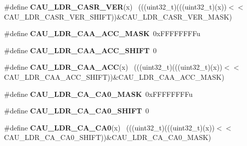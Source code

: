 \begin{DoxyCompactItemize}
\item 
\hypertarget{group___c_a_u___register___masks_ga2188570babc40431a7ef99097d863534}{}\#define {\bfseries C\+A\+U\+\_\+\+L\+D\+R\+\_\+\+C\+A\+S\+R\+\_\+\+V\+E\+R}(x)                                        ~(((uint32\+\_\+t)(((uint32\+\_\+t)(x))$<$$<$C\+A\+U\+\_\+\+L\+D\+R\+\_\+\+C\+A\+S\+R\+\_\+\+V\+E\+R\+\_\+\+S\+H\+I\+F\+T))\&C\+A\+U\+\_\+\+L\+D\+R\+\_\+\+C\+A\+S\+R\+\_\+\+V\+E\+R\+\_\+\+M\+A\+S\+K)\label{group___c_a_u___register___masks_ga2188570babc40431a7ef99097d863534}

\item 
\hypertarget{group___c_a_u___register___masks_ga25d23cb2902598fd7377214fc4c831c4}{}\#define {\bfseries C\+A\+U\+\_\+\+L\+D\+R\+\_\+\+C\+A\+A\+\_\+\+A\+C\+C\+\_\+\+M\+A\+S\+K}~0x\+F\+F\+F\+F\+F\+F\+F\+Fu\label{group___c_a_u___register___masks_ga25d23cb2902598fd7377214fc4c831c4}

\item 
\hypertarget{group___c_a_u___register___masks_ga3d0a4b449aa40e73d9ef6540832fec08}{}\#define {\bfseries C\+A\+U\+\_\+\+L\+D\+R\+\_\+\+C\+A\+A\+\_\+\+A\+C\+C\+\_\+\+S\+H\+I\+F\+T}~0\label{group___c_a_u___register___masks_ga3d0a4b449aa40e73d9ef6540832fec08}

\item 
\hypertarget{group___c_a_u___register___masks_ga4c5e6496e3c7b2325fc05f933002b553}{}\#define {\bfseries C\+A\+U\+\_\+\+L\+D\+R\+\_\+\+C\+A\+A\+\_\+\+A\+C\+C}(x)                                          ~(((uint32\+\_\+t)(((uint32\+\_\+t)(x))$<$$<$C\+A\+U\+\_\+\+L\+D\+R\+\_\+\+C\+A\+A\+\_\+\+A\+C\+C\+\_\+\+S\+H\+I\+F\+T))\&C\+A\+U\+\_\+\+L\+D\+R\+\_\+\+C\+A\+A\+\_\+\+A\+C\+C\+\_\+\+M\+A\+S\+K)\label{group___c_a_u___register___masks_ga4c5e6496e3c7b2325fc05f933002b553}

\item 
\hypertarget{group___c_a_u___register___masks_ga15ab69e214b180e4459b220f28db6671}{}\#define {\bfseries C\+A\+U\+\_\+\+L\+D\+R\+\_\+\+C\+A\+\_\+\+C\+A0\+\_\+\+M\+A\+S\+K}~0x\+F\+F\+F\+F\+F\+F\+F\+Fu\label{group___c_a_u___register___masks_ga15ab69e214b180e4459b220f28db6671}

\item 
\hypertarget{group___c_a_u___register___masks_ga3f71ad6211265982fcdc2aa519a357c7}{}\#define {\bfseries C\+A\+U\+\_\+\+L\+D\+R\+\_\+\+C\+A\+\_\+\+C\+A0\+\_\+\+S\+H\+I\+F\+T}~0\label{group___c_a_u___register___masks_ga3f71ad6211265982fcdc2aa519a357c7}

\item 
\hypertarget{group___c_a_u___register___masks_ga35c182e7387d41a64c85990bb3a40ee3}{}\#define {\bfseries C\+A\+U\+\_\+\+L\+D\+R\+\_\+\+C\+A\+\_\+\+C\+A0}(x)                                            ~(((uint32\+\_\+t)(((uint32\+\_\+t)(x))$<$$<$C\+A\+U\+\_\+\+L\+D\+R\+\_\+\+C\+A\+\_\+\+C\+A0\+\_\+\+S\+H\+I\+F\+T))\&C\+A\+U\+\_\+\+L\+D\+R\+\_\+\+C\+A\+\_\+\+C\+A0\+\_\+\+M\+A\+S\+K)\label{group___c_a_u___register___masks_ga35c182e7387d41a64c85990bb3a40ee3}


\end{DoxyCompactItemize}
